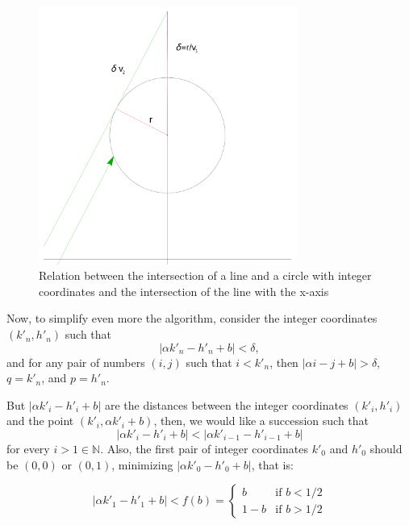 \documentclass[prl,amsmath,amssymb, twocolumn, showpacs]{revtex4-1}
\begin{document}
\begin{figure}
\centering
\includegraphics [width=240pt]{./line-circle.png}
\caption{Relation between the intersection of a line and a circle with integer coordinates and the intersection of the line with the x-axis}
\label{fig:circle}
\end{figure}


Now, to simplify even more the algorithm, consider the integer coordinates $(k'_n, h'_n)$ such that
\begin{equation}
|\alpha k'_n -h'_n + b|< \delta,
\label{eq:1}
\end{equation}
and for any pair of numbers $(i,j)$ such that $i<k'_n$, then $|\alpha i -j+ b|> \delta$,  $q=k'_n$, and $p=h'_n$. 
 
But $|\alpha k'_i -h'_i + b|$ are the distances between the integer coordinates $(k'_i,h'_i)$ and the point $( k'_i ,\alpha k'_i + b)$, then, we would like a succession such that  
\begin{equation}
|\alpha k'_i -h'_i + b|<|\alpha k'_{i-1} -h'_{i-1} + b|
\label{eq:iteration}
\end{equation}
for every $i>1 \in   \mathbb{N}$. Also, the first pair of integer coordinates $k'_0$ and $h'_0$ should be $(0,0)$ or $(0,1)$, minimizing $|\alpha k'_0 -h'_0 + b|$, that is:

\begin{equation}
|\alpha k'_1 -h'_1 + b|< f(b) = \begin{cases} b &\mbox{if } b < 1/2 \\ 
1-b & \mbox{if } b > 1/2 \end{cases} 
\label{eq:prima}
\end{equation}
\end{document}
